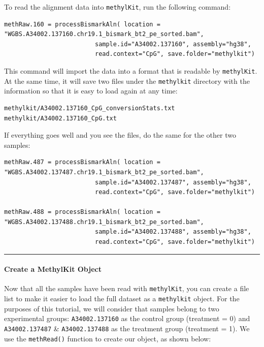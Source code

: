\documentclass[
]{book}
\begin{document}
To read the alignment data into \texttt{methylKit}, run the following command:

\begin{verbatim}
methRaw.160 = processBismarkAln( location = "WGBS.A34002.137160.chr19.1_bismark_bt2_pe_sorted.bam",
                         sample.id="A34002.137160", assembly="hg38", 
                         read.context="CpG", save.folder="methylkit")
\end{verbatim}

This command will import the data into a format that is readable by \texttt{methylKit}. At the same time, it will save two files under the \texttt{methylkit} directory with the information so that it is easy to load again at any time:

\begin{verbatim}
methylkit/A34002.137160_CpG_conversionStats.txt
methylkit/A34002.137160_CpG.txt
\end{verbatim}

If everything goes well and you see the files, do the same for the other two samples:

\begin{verbatim}
methRaw.487 = processBismarkAln( location = "WGBS.A34002.137487.chr19.1_bismark_bt2_pe_sorted.bam",
                         sample.id="A34002.137487", assembly="hg38", 
                         read.context="CpG", save.folder="methylkit")
                         
methRaw.488 = processBismarkAln( location = "WGBS.A34002.137488.chr19.1_bismark_bt2_pe_sorted.bam",
                         sample.id="A34002.137488", assembly="hg38", 
                         read.context="CpG", save.folder="methylkit")
\end{verbatim}

\begin{center}\rule{0.5\linewidth}{0.5pt}\end{center}

\paragraph{Create a MethylKit Object}\label{create-a-methylkit-object}

Now that all the samples have been read with \texttt{methylKit}, you can create a file list to make it easier to load the full dataset as a \texttt{methylkit} object. For the purposes of this tutorial, we will consider that samples belong to two experimental groups: \texttt{A34002.137160} as the control group (treatment = 0) and \texttt{A34002.137487} \& \texttt{A34002.137488} as the treatment group (treatment = 1). We use the \texttt{methRead()} function to create our object, as shown below:
\end{document}
